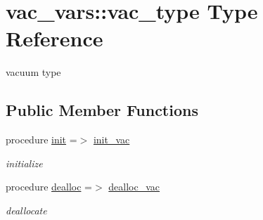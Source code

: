 \hypertarget{structvac__vars_1_1vac__type}{}\section{vac\+\_\+vars\+:\+:vac\+\_\+type Type Reference}
\label{structvac__vars_1_1vac__type}


vacuum type  


\subsection*{Public Member Functions}
\begin{DoxyCompactItemize}
\item 
procedure \hyperlink{structvac__vars_1_1vac__type_a8ae602ebb68bb7e2e31cd248a0671f9e}{init} =$>$ \hyperlink{namespacevac__vars_a81df0b01b0c2bf8072453f4ca12e2d5e}{init\+\_\+vac}
\begin{DoxyCompactList}\small\item\em initialize \end{DoxyCompactList}\item 
procedure \hyperlink{structvac__vars_1_1vac__type_ab183b5ee11feae9e29b8b9710a48c577}{dealloc} =$>$ \hyperlink{namespacevac__vars_aa6669ed787cf96e8f8fa665149bc83a3}{dealloc\+\_\+vac}
\begin{DoxyCompactList}\small\item\em deallocate \end{DoxyCompactList}\end{DoxyCompactItemize}

